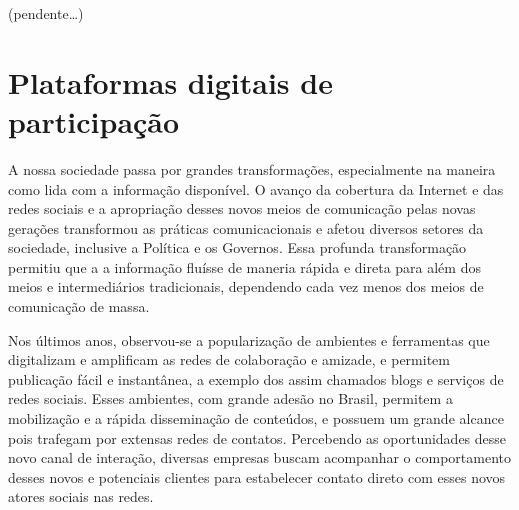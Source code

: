 \documentclass{article}
\begin{document}
%

(pendente\ldots)

\section{Plataformas digitais de participação}


A nossa sociedade passa por grandes transformações, especialmente na maneira
como lida com a informação disponível. O avanço da cobertura da Internet e das
redes sociais e a apropriação desses novos meios de comunicação pelas novas
gerações transformou as práticas comunicacionais e afetou diversos setores da
sociedade, inclusive a Política e os Governos. Essa profunda transformação
permitiu que a a informação fluísse de maneria rápida e direta para além dos
meios e intermediários tradicionais, dependendo cada vez menos dos meios de
comunicação de massa. 

Nos últimos anos, observou-se a popularização de ambientes e ferramentas que
digitalizam e amplificam as redes de colaboração e amizade, e permitem
publicação fácil e instantânea, a exemplo dos assim chamados blogs e serviços
de redes sociais. Esses ambientes, com grande adesão no Brasil, permitem a
mobilização e a rápida disseminação de conteúdos,  e possuem um grande alcance
pois trafegam por extensas redes de contatos. Percebendo as oportunidades desse
novo canal de interação, diversas empresas buscam acompanhar o comportamento
desses novos e potenciais clientes para estabelecer contato direto com esses
novos atores sociais nas redes.
\end{document}
